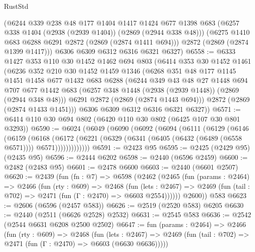 \begin{lexlean}{RustStd}
\begin{coremodule}
      (@6244
        @339
        @238
        @48
        @177
        @1404
        @1417
        @1424
        @677
        @1398
        @683
        (@6257 @338 @1404 (@2938 (@2939 @1404)) (@2869 (@2944 @338 @48)))
        (@6275 @1410 @683 @6288 @6291 @2872 (@2869 (@2874 @1411 @694)))
        @2872
        (@2869 (@2874 @1399 @1417)))
      @6306
      @6309
      @6312
      @6316
      @6321
      @6327)
@6558 := @6333
    @1427
    @353
    @110
    @30
    @1452
    @1462
    @694
    @803
    (@6414
      @353
      @30
      @1452
      @1461
      (@6236
        @352
        @210
        @30
        @1452
        @1459
        @1346
        (@6268
          @351
          @48
          @177
          @1145
          @1451
          @1458
          @677
          @1432
          @683
          @6288
          (@6244
            @349
            @43
            @48
            @27
            @1448
            @694
            @707
            @677
            @1442
            @683
            (@6257 @348 @1448 (@2938 (@2939 @1448)) (@2869 (@2944 @348 @48)))
            @6291
            @2872
            (@2869 (@2874 @1443 @694)))
          @2872
          (@2869 (@2874 @1433 @1451)))
        @6306
        @6309
        @6312
        @6316
        @6321
        @6327))
@6571 := @6414 @110 @30 @694 @802 (@6420 @110 @30 @802 (@6425 @107 @30 @801 @3293))
@6590 := @6024
    (@6049
      (@6090
        (@6092
          (@6094
            (@6111
              (@6129
                (@6146
                  (@6159
                    (@6168
                      (@6172
                        (@6221
                          (@6329 (@6341 (@6405 (@6432 (@6489 (@6558 @6571)))) @6571)))))))))))))
@6591 := @2423 @95
@6595 := @2425 (@2429 @95) (@2435 @95)
@6596 := @2444 @6202
@6598 := @2440 (@6596 @2459)
@6600 := @2482 (@2483 @95)
@6601 := @2478 @6600
@6603 := @2440 (@6601 @2507)
@6620 := @2439
    (fun (fn : @7) =>
    @6598
      (@2462
        (@2465
          (fun (params : @2464) =>
          @2466
            (fun (rty : @609) =>
            @2468
              (fun (lets : @2467) =>
              @2469 (fun (tail : @702) => @2471 (fun (Γ : @2470) => @6603 @2554))))))
        @2600))
    @583
@6623 := @2606 (@6596 (@2457 @583))
@6626 := @2519 (@2520 @583) @6205
@6630 := @2440 (@2511 (@6626 @2528) @2532)
@6631 := @2545 @583
@6636 := @2542 (@2544 @6631 @6208 @2500 @2502)
@6647 := fun (params : @2464) =>
  @2466
    (fun (rty : @609) =>
    @2468
      (fun (lets : @2467) =>
      @2469 (fun (tail : @702) => @2471 (fun (Γ : @2470) => @6603 (@6630 @6636)))))

\end{coremodule}
\end{lexlean}
